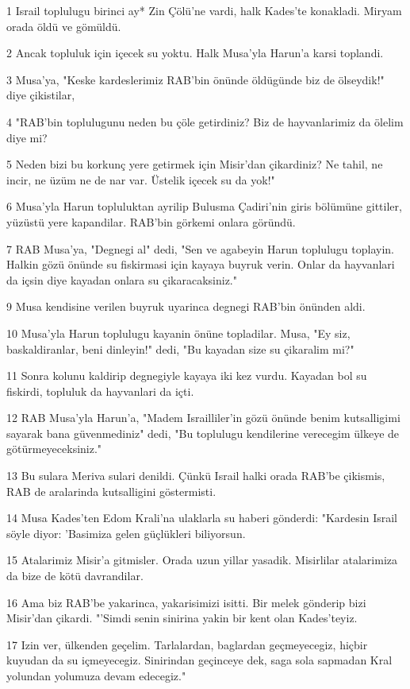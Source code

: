 \par 1 Israil toplulugu birinci ay* Zin Çölü'ne vardi, halk Kades'te konakladi. Miryam orada öldü ve gömüldü.
\par 2 Ancak topluluk için içecek su yoktu. Halk Musa'yla Harun'a karsi toplandi.
\par 3 Musa'ya, "Keske kardeslerimiz RAB'bin önünde öldügünde biz de ölseydik!" diye çikistilar,
\par 4 "RAB'bin toplulugunu neden bu çöle getirdiniz? Biz de hayvanlarimiz da ölelim diye mi?
\par 5 Neden bizi bu korkunç yere getirmek için Misir'dan çikardiniz? Ne tahil, ne incir, ne üzüm ne de nar var. Üstelik içecek su da yok!"
\par 6 Musa'yla Harun topluluktan ayrilip Bulusma Çadiri'nin giris bölümüne gittiler, yüzüstü yere kapandilar. RAB'bin görkemi onlara göründü.
\par 7 RAB Musa'ya, "Degnegi al" dedi, "Sen ve agabeyin Harun toplulugu toplayin. Halkin gözü önünde su fiskirmasi için kayaya buyruk verin. Onlar da hayvanlari da içsin diye kayadan onlara su çikaracaksiniz."
\par 9 Musa kendisine verilen buyruk uyarinca degnegi RAB'bin önünden aldi.
\par 10 Musa'yla Harun toplulugu kayanin önüne topladilar. Musa, "Ey siz, baskaldiranlar, beni dinleyin!" dedi, "Bu kayadan size su çikaralim mi?"
\par 11 Sonra kolunu kaldirip degnegiyle kayaya iki kez vurdu. Kayadan bol su fiskirdi, topluluk da hayvanlari da içti.
\par 12 RAB Musa'yla Harun'a, "Madem Israilliler'in gözü önünde benim kutsalligimi sayarak bana güvenmediniz" dedi, "Bu toplulugu kendilerine verecegim ülkeye de götürmeyeceksiniz."
\par 13 Bu sulara Meriva sulari denildi. Çünkü Israil halki orada RAB'be çikismis, RAB de aralarinda kutsalligini göstermisti.
\par 14 Musa Kades'ten Edom Krali'na ulaklarla su haberi gönderdi: "Kardesin Israil söyle diyor: 'Basimiza gelen güçlükleri biliyorsun.
\par 15 Atalarimiz Misir'a gitmisler. Orada uzun yillar yasadik. Misirlilar atalarimiza da bize de kötü davrandilar.
\par 16 Ama biz RAB'be yakarinca, yakarisimizi isitti. Bir melek gönderip bizi Misir'dan çikardi. "'Simdi senin sinirina yakin bir kent olan Kades'teyiz.
\par 17 Izin ver, ülkenden geçelim. Tarlalardan, baglardan geçmeyecegiz, hiçbir kuyudan da su içmeyecegiz. Sinirindan geçinceye dek, saga sola sapmadan Kral yolundan yolumuza devam edecegiz."
